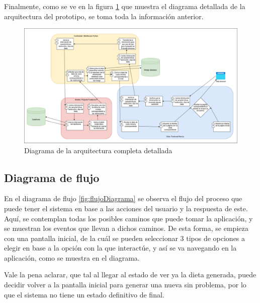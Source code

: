 \noindent Finalmente, como se ve en la figura \ref{fig:arquiCompletaDiagrama} que muestra el diagrama detallada de la arquitectura del prototipo, se toma toda la informaci\'on anterior.

\begin{figure}[H]
        \centering
        \includegraphics[width=\textwidth]{img/Diseno/arquitectura completa.png}
        \caption{Diagrama de la arquitectura completa detallada}
        \label{fig:arquiCompletaDiagrama}
    \end{figure}

\subsection{Diagrama de flujo}

\noindent En el diagrama de flujo \ref{fig:flujoDiagrama} se observa el flujo del proceso que puede tener el sistema en base a las acciones del usuario y la respuesta de este. Aqu\'i, se contemplan todas los posibles caminos que puede tomar la aplicaci\'on, y se muestran los eventos que llevan a dichos caminos. De esta forma, se empieza con una pantalla inicial, de la cu\'al se pueden seleccionar 3 tipos de opciones a elegir en base a la opci\'on con la que interact\'ue, y as\'i se va navegando en la aplicaci\'on, como se muestra en el diagrama.

\noindent Vale la pena aclarar, que tal al llegar al estado de ver ya la dieta generada, puede decidir volver a la pantalla inicial para generar una nueva sin problema, por lo que el sistema no tiene un estado definitivo de final.
 
